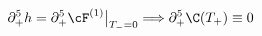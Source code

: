 \begin{equation}\label{C=0}
\partial_+^5 h= \partial_+^5\cF^{(1)}\big|_{T_{-}=0} \Longrightarrow
\partial_+^5 \C(T_{+})\equiv 0
\end{equation}

